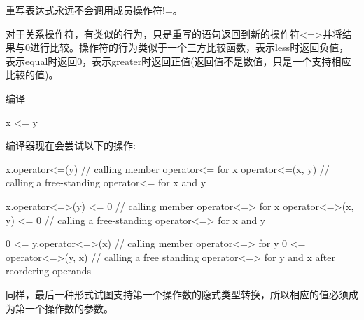 重写表达式永远不会调用成员操作符!=。


对于关系操作符，有类似的行为，只是重写的语句返回到新的操作符<=>并将结果与0进行比较。操作符的行为类似于一个三方比较函数，表示less时返回负值，表示equal时返回0，表示greater时返回正值(返回值不是数值，只是一个支持相应比较的值)。

编译

\begin{cpp}
x <= y
\end{cpp}

编译器现在会尝试以下的操作:

\begin{cpp}
x.operator<=(y) // calling member operator<= for x
operator<=(x, y) // calling a free-standing operator<= for x and y

x.operator<=>(y) <= 0 // calling member operator<=> for x
operator<=>(x, y) <= 0 // calling a free-standing operator<=> for x and y

0 <= y.operator<=>(x) // calling member operator<=> for y
0 <= operator<=>(y, x) // calling a free standing operator<=> for y and x after reordering operands
\end{cpp}

同样，最后一种形式试图支持第一个操作数的隐式类型转换，所以相应的值必须成为第一个操作数的参数。






